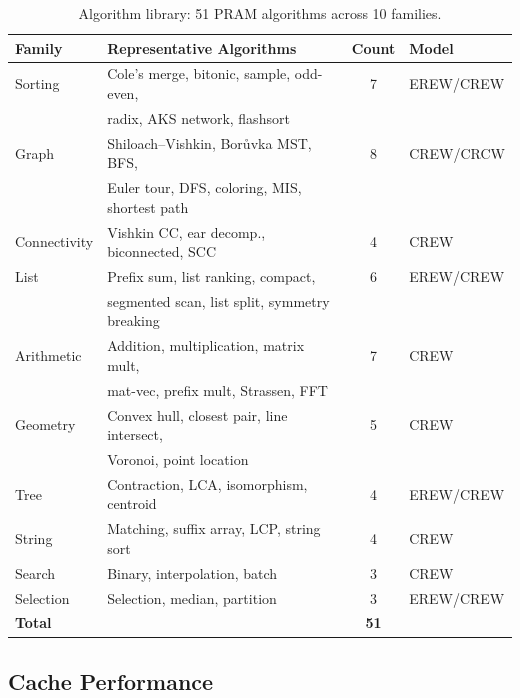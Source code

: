\documentclass[11pt]{article}
\begin{document}
\begin{table}[t]
\centering
\caption{Algorithm library: 51 PRAM algorithms across 10 families.}
\label{tab:algorithms}
\begin{tabular}{@{}llcl@{}}
\toprule
\textbf{Family} & \textbf{Representative Algorithms} & \textbf{Count} & \textbf{Model} \\
\midrule
Sorting & Cole's merge, bitonic, sample, odd-even, & 7 & EREW/CREW \\
  & radix, AKS network, flashsort & & \\
Graph & Shiloach--Vishkin, Bor\r{u}vka MST, BFS, & 8 & CREW/CRCW \\
  & Euler tour, DFS, coloring, MIS, shortest path & & \\
Connectivity & Vishkin CC, ear decomp., biconnected, SCC & 4 & CREW \\
List & Prefix sum, list ranking, compact, & 6 & EREW/CREW \\
  & segmented scan, list split, symmetry breaking & & \\
Arithmetic & Addition, multiplication, matrix mult, & 7 & CREW \\
  & mat-vec, prefix mult, Strassen, FFT & & \\
Geometry & Convex hull, closest pair, line intersect, & 5 & CREW \\
  & Voronoi, point location & & \\
Tree & Contraction, LCA, isomorphism, centroid & 4 & EREW/CREW \\
String & Matching, suffix array, LCP, string sort & 4 & CREW \\
Search & Binary, interpolation, batch & 3 & CREW \\
Selection & Selection, median, partition & 3 & EREW/CREW \\
\midrule
\textbf{Total} & & \textbf{51} & \\
\bottomrule
\end{tabular}
\end{table}

\subsection{Cache Performance}
\end{document}

